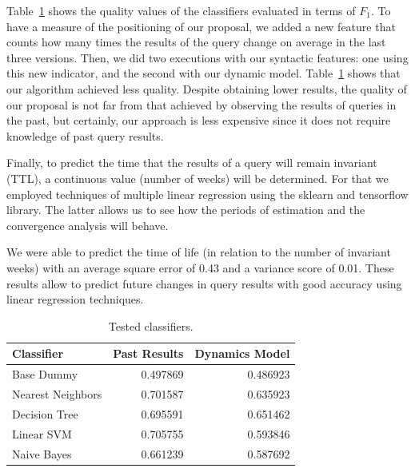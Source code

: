\documentclass[runningheads]{llncs}
\begin{document}
Table~\ref{tab:classifier} shows the quality values of the classifiers evaluated in terms of $F_1$. To have a measure of the positioning of our proposal, we added a new feature that counts how many times the results of the query change on average in the last three versions. Then, we did two executions with our syntactic features: one using this new indicator, and the second with our dynamic model. Table~\ref{tab:classifier} shows that our algorithm achieved less quality. Despite obtaining lower results, the quality of our proposal is not far from that achieved by observing the results of queries in the past, but certainly, our approach is less expensive since it does not require knowledge of past query results.

Finally, to predict the time that the results of a query will remain invariant (TTL), a continuous value (number of weeks) will be determined. For that we employed techniques of multiple linear regression using the sklearn and tensorflow library. The latter allows us to see how the periods of estimation and the convergence analysis will behave.

We were able to predict the time of life (in relation to the number of invariant weeks) with an average square error of 0.43 and a variance score of 0.01. These results allow to predict future changes in query results with good accuracy using linear regression techniques.


\begin{table}[h]
	\centering
	\caption{Tested classifiers.}
	\label{tab:classifier}
	\begin{tabular}{|l|r|r|}    \hline		
		Classifier                   & Past Results & Dynamics Model \\    \hline
		Base Dummy 					 & 0.497869 & 0.486923 \\
		Nearest Neighbors            & 0.701587 & 0.635923 \\
		Decision Tree                & 0.695591 & 0.651462 \\
		Linear SVM                   & 0.705755 & 0.593846 \\
		Naive Bayes                  & 0.661239 & 0.587692 \\    \hline
	\end{tabular}
\end{table}

\end{document}
